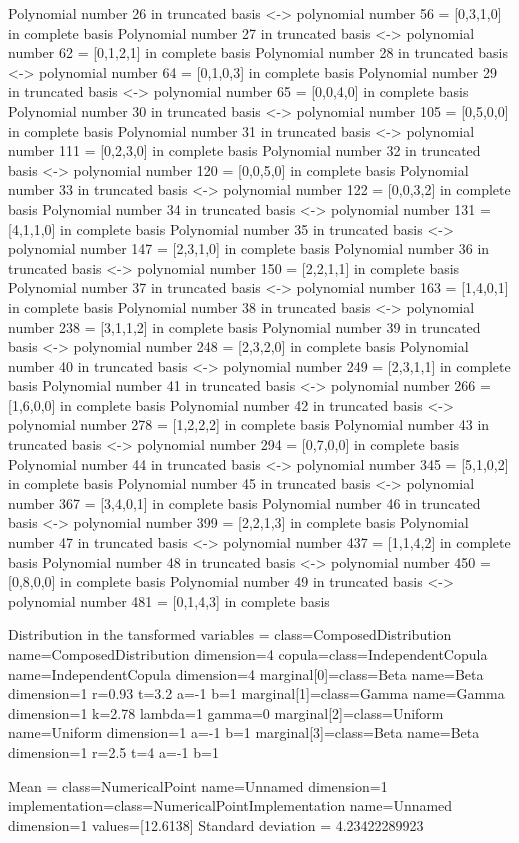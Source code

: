 Polynomial number  26  in truncated basis <-> polynomial number  56  =  [0,3,1,0]  in complete basis
Polynomial number  27  in truncated basis <-> polynomial number  62  =  [0,1,2,1]  in complete basis
Polynomial number  28  in truncated basis <-> polynomial number  64  =  [0,1,0,3]  in complete basis
Polynomial number  29  in truncated basis <-> polynomial number  65  =  [0,0,4,0]  in complete basis
Polynomial number  30  in truncated basis <-> polynomial number  105  =  [0,5,0,0]  in complete basis
Polynomial number  31  in truncated basis <-> polynomial number  111  =  [0,2,3,0]  in complete basis
Polynomial number  32  in truncated basis <-> polynomial number  120  =  [0,0,5,0]  in complete basis
Polynomial number  33  in truncated basis <-> polynomial number  122  =  [0,0,3,2]  in complete basis
Polynomial number  34  in truncated basis <-> polynomial number  131  =  [4,1,1,0]  in complete basis
Polynomial number  35  in truncated basis <-> polynomial number  147  =  [2,3,1,0]  in complete basis
Polynomial number  36  in truncated basis <-> polynomial number  150  =  [2,2,1,1]  in complete basis
Polynomial number  37  in truncated basis <-> polynomial number  163  =  [1,4,0,1]  in complete basis
Polynomial number  38  in truncated basis <-> polynomial number  238  =  [3,1,1,2]  in complete basis
Polynomial number  39  in truncated basis <-> polynomial number  248  =  [2,3,2,0]  in complete basis
Polynomial number  40  in truncated basis <-> polynomial number  249  =  [2,3,1,1]  in complete basis
Polynomial number  41  in truncated basis <-> polynomial number  266  =  [1,6,0,0]  in complete basis
Polynomial number  42  in truncated basis <-> polynomial number  278  =  [1,2,2,2]  in complete basis
Polynomial number  43  in truncated basis <-> polynomial number  294  =  [0,7,0,0]  in complete basis
Polynomial number  44  in truncated basis <-> polynomial number  345  =  [5,1,0,2]  in complete basis
Polynomial number  45  in truncated basis <-> polynomial number  367  =  [3,4,0,1]  in complete basis
Polynomial number  46  in truncated basis <-> polynomial number  399  =  [2,2,1,3]  in complete basis
Polynomial number  47  in truncated basis <-> polynomial number  437  =  [1,1,4,2]  in complete basis
Polynomial number  48  in truncated basis <-> polynomial number  450  =  [0,8,0,0]  in complete basis
Polynomial number  49  in truncated basis <-> polynomial number  481  =  [0,1,4,3]  in complete basis

Distribution in the tansformed variables =  class=ComposedDistribution name=ComposedDistribution dimension=4 copula=class=IndependentCopula name=IndependentCopula dimension=4 marginal[0]=class=Beta name=Beta dimension=1 r=0.93 t=3.2 a=-1 b=1 marginal[1]=class=Gamma name=Gamma dimension=1 k=2.78 lambda=1 gamma=0 marginal[2]=class=Uniform name=Uniform dimension=1 a=-1 b=1 marginal[3]=class=Beta name=Beta dimension=1 r=2.5 t=4 a=-1 b=1

Mean = class=NumericalPoint name=Unnamed dimension=1 implementation=class=NumericalPointImplementation name=Unnamed dimension=1 values=[12.6138]
Standard deviation = 4.23422289923

